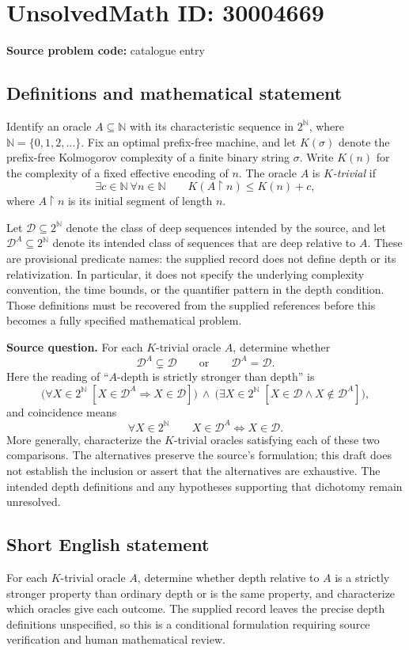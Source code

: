 \documentclass[11pt]{article}
\newcommand{\N}{\mathbb{N}}
\begin{document}
\section*{UnsolvedMath ID: 30004669}
\textbf{Source problem code:} catalogue entry
\subsection{Definitions and mathematical statement}
Identify an oracle \(A\subseteq\N\) with its characteristic sequence in \(2^{\N}\), where \(\N=\{0,1,2,\ldots\}\). Fix an optimal prefix-free machine, and let \(K(\sigma)\) denote the prefix-free Kolmogorov complexity of a finite binary string \(\sigma\). Write \(K(n)\) for the complexity of a fixed effective encoding of \(n\). The oracle \(A\) is \emph{\(K\)-trivial} if
\[
\exists c\in\N\ \forall n\in\N\qquad K(A\upharpoonright n)\leq K(n)+c,
\]
where \(A\upharpoonright n\) is its initial segment of length \(n\).

Let \(\mathcal D\subseteq 2^{\N}\) denote the class of deep sequences intended by the source, and let \(\mathcal D^{A}\subseteq 2^{\N}\) denote its intended class of sequences that are deep relative to \(A\). These are provisional predicate names: the supplied record does not define depth or its relativization. In particular, it does not specify the underlying complexity convention, the time bounds, or the quantifier pattern in the depth condition. Those definitions must be recovered from the supplied references before this becomes a fully specified mathematical problem.

\textbf{Source question.} For each \(K\)-trivial oracle \(A\), determine whether
\[
\mathcal D^{A}\subsetneq\mathcal D
\qquad\text{or}\qquad
\mathcal D^{A}=\mathcal D.
\]
Here the reading of ``\(A\)-depth is strictly stronger than depth'' is
\[
\bigl(\forall X\in 2^{\N}\;[X\in\mathcal D^{A}\Rightarrow X\in\mathcal D]\bigr)
\ \land\
\bigl(\exists X\in 2^{\N}\;[X\in\mathcal D\land X\notin\mathcal D^{A}]\bigr),
\]
and coincidence means
\[
\forall X\in 2^{\N}\qquad
X\in\mathcal D^{A}\Longleftrightarrow X\in\mathcal D.
\]
More generally, characterize the \(K\)-trivial oracles satisfying each of these two comparisons. The alternatives preserve the source's formulation; this draft does not establish the inclusion or assert that the alternatives are exhaustive. The intended depth definitions and any hypotheses supporting that dichotomy remain unresolved.
\subsection{Short English statement}
For each \(K\)-trivial oracle \(A\), determine whether depth relative to \(A\) is a strictly stronger property than ordinary depth or is the same property, and characterize which oracles give each outcome. The supplied record leaves the precise depth definitions unspecified, so this is a conditional formulation requiring source verification and human mathematical review.
\end{document}
